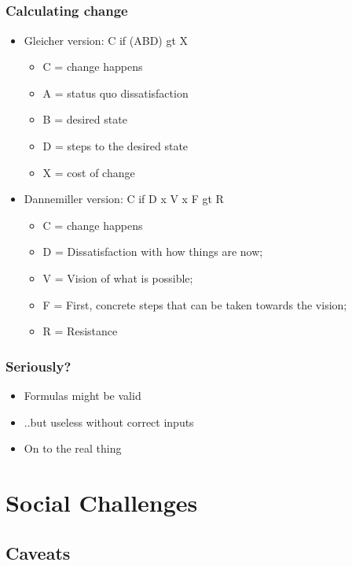 \documentclass[t]{beamer}
\begin{document}
\subsection{}

\begin{frame}
	\frametitle{Calculating change}
	\begin{itemize}
		\item Gleicher version: C if (ABD) gt X
		\begin{itemize}
			\item C = change happens
			\item A = status quo dissatisfaction
			\item B = desired state
			\item D = steps to the desired state
			\item X = cost of change
		\end{itemize}
		\item Dannemiller version: C if D x V x F gt R
		\begin{itemize}
			\item C = change happens
			\item D = Dissatisfaction with how things are now;
			\item V = Vision of what is possible;
			\item F = First, concrete steps that can be taken towards the vision;
			\item R = Resistance
		\end{itemize}
	\end{itemize}
\end{frame}

\begin{frame}
	\frametitle{Seriously?}
	\begin{itemize}
		\item Formulas might be valid
		\item ..but useless without correct inputs
		\item On to the real thing
	\end{itemize}
\end{frame}



\section{Social Challenges}

\subsection{Caveats}
\end{document}
